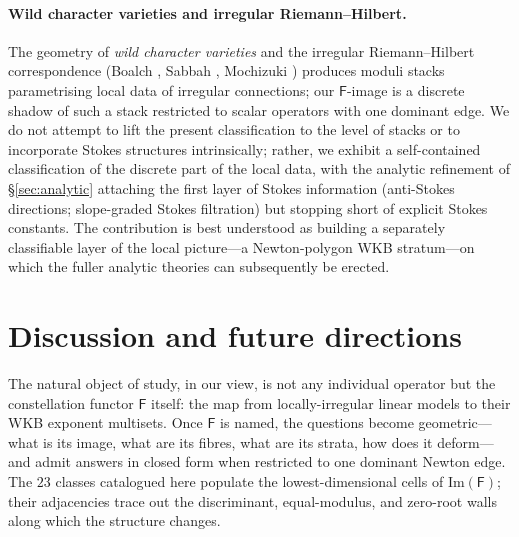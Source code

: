 \documentclass[11pt,a4paper]{article}
\theoremstyle{plain}
\theoremstyle{definition}
\theoremstyle{remark}
\newcommand{\Fclass}{\mathsf{F}}
\begin{document}
\paragraph{Wild character varieties and irregular Riemann--Hilbert.}
The geometry of \emph{wild character varieties} and the irregular
Riemann--Hilbert correspondence (Boalch
\cite{boalch-stokes,boalch-wildhodge}, Sabbah \cite{sabbah-polarizable},
Mochizuki \cite{mochizuki-asymptotic}) produces moduli stacks parametrising
local data of irregular connections; our $\Fclass$-image is a discrete
shadow of such a stack restricted to scalar operators with one dominant
edge. We do not attempt to lift the present classification to the level
of stacks or to incorporate Stokes structures intrinsically; rather, we
exhibit a self-contained classification of the discrete part of the local
data, with the analytic refinement of \S\ref{sec:analytic} attaching the
first layer of Stokes information (anti-Stokes directions; slope-graded
Stokes filtration) but stopping short of explicit Stokes constants. The
contribution is best understood as building a separately classifiable
layer of the local picture---a Newton-polygon WKB stratum---on which the
fuller analytic theories can subsequently be erected.


\section{Discussion and future directions}\label{sec:vision}

The natural object of study, in our view, is not any individual operator
but the constellation functor $\Fclass$ itself: the map from
locally-irregular linear models to their WKB exponent multisets. Once
$\Fclass$ is named, the questions become geometric---what is its image,
what are its fibres, what are its strata, how does it deform---and admit
answers in closed form when restricted to one dominant Newton edge. The
$23$ classes catalogued here populate the lowest-dimensional cells of
$\mathrm{Im}(\Fclass)$; their adjacencies trace out the discriminant,
equal-modulus, and zero-root walls along which the structure changes.
\end{document}
